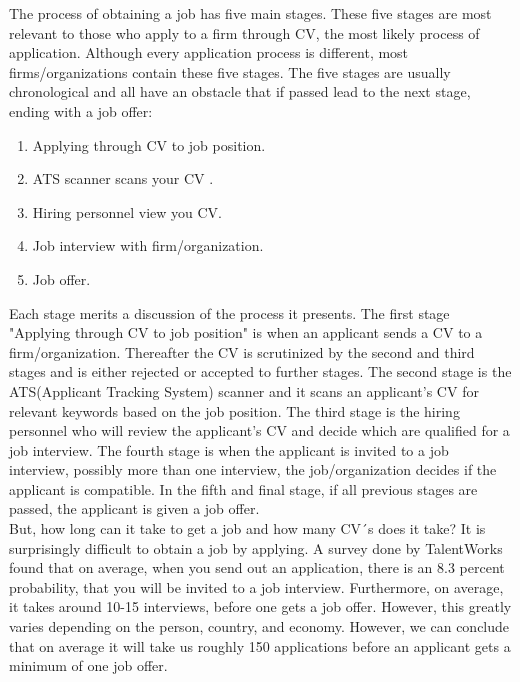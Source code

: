 The process of obtaining a job has five main stages.
These five stages are most relevant to those who apply to a firm through CV, the most likely process of application.
Although every application process is different, most firms/organizations contain these five stages.
The five stages are usually chronological and all have an obstacle that if passed lead to the next stage, ending with a job offer:
\begin{enumerate} 
   \item Applying through CV to job position.
   \item ATS scanner scans your CV \cite{ATS-scanner}.
   \item Hiring personnel view you CV.
   \item Job interview with firm/organization.
   \item Job offer.\cite{Process_steps_unemployment}
\end{enumerate} \label{Five_stages_of_obtaining_a_job}
Each stage merits a discussion of the process it presents.
The first stage "Applying through CV to job position" is when an applicant sends a CV to a firm/organization.
Thereafter the CV is scrutinized by the second and third stages and is either rejected or accepted to further stages.
The second stage is the ATS(Applicant Tracking System) scanner and it scans an applicant's CV for relevant keywords based on the job position.
The third stage is the hiring personnel who will review the applicant's CV and decide which are qualified for a job interview.
The fourth stage is when the applicant is invited to a job interview, possibly more than one interview, the job/organization decides if the applicant is compatible.
In the fifth and final stage, if all previous stages are passed, the applicant is given a job offer. \\
 
But, how long can it take to get a job and how many CV´s does it take?
It is surprisingly difficult to obtain a job by applying.
A survey done by TalentWorks found that on average, when you send out an application, there is an 8.3 percent probability, that you will be invited to a job interview. 
Furthermore, on average, it takes around 10-15 interviews, before one gets a job offer. 
However, this greatly varies depending on the person, country, and economy.
However, we can conclude that on average it will take us roughly 150 applications before an applicant gets a minimum of one job offer.\cite{HR-sales} \\

